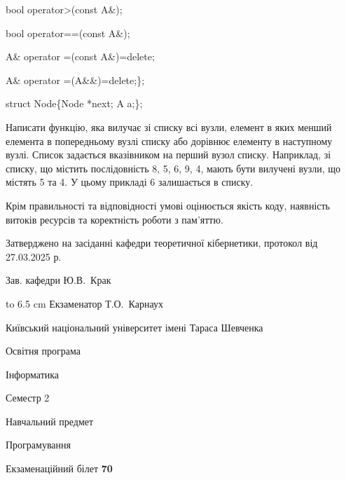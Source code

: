 \documentclass[12pt, ukrainian]{article}
\begin{document}
{\quad  bool operator>(const A\&); 

\quad  bool operator==(const A\&); 

\quad A\& operator =(const A\&)=delete; 

\quad  A\& operator =(A\&\&)=delete;\};

struct Node\{Node *next; A a;\};

 Написати функцію, яка вилучає зі списку всі вузли, елемент в яких менший елемента в попередньому вузлі списку або дорівнює елементу в наступному вузлі. Список задається вказівником на перший вузол списку. Наприклад, зі списку, що містить послідовність 8, 5, 6, 9, 4, мають бути вилучені вузли, що містять 5 та 4. У цьому прикладі 6 залишається в списку.

Крім правильності та відповідності умові оцінюється якість коду, наявність витоків ресурсів та коректність роботи з пам'яттю. 

}
{\smallskip\smallskip \begin {scriptsize} Затверджено на засіданні кафедри теоретичної кібернетики, протокол   від   27.03.2025 р.\par\smallskip\smallskip\smallskip\smallskip
{\parbox {6.5 cm} {Зав. кафедри \dotfill Ю.В.~Крак}}\hspace {0.7cm} {\hbox to 6.5 cm { Екзаменатор \dotfill Т.О.~Карнаух}} \end{scriptsize}}
\newpage
{{\begin {scriptsize}\par
{ \center  Київський національний університет імені Тараса Шевченка \par}
{\parbox {5 cm}{Освітня програма \hfill}{\parbox {7 cm}{Інформатика\hfill}}\parbox {6 cm}{\hfill Семестр 2}}\par
{\parbox {5 cm} {Навчальний предмет \hfill}\parbox {7 cm}{Програмування \hfill}\parbox {6cm}{\hfill}\par}\vspace{-15pt} \end{scriptsize}}{\center Екзаменаційний білет \No \textbf { 70 }\par}}
\end{document}
